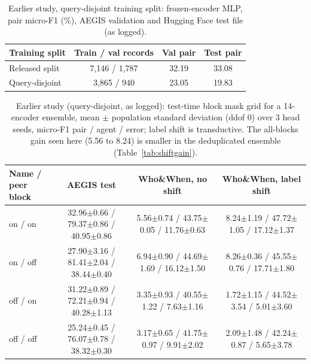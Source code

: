 
\begin{table}[t]
\caption{Earlier study, query-disjoint training split: frozen-encoder MLP, pair micro-F1 (\%), AEGIS validation and Hugging Face test file (as logged).}
\label{tab:qd}
\centering\footnotesize\setlength{\tabcolsep}{3pt}
\begin{tabular}{@{}lccc@{}}
\toprule
Training split & Train / val records & Val pair & Test pair \\
\midrule
Released split & 7,146 / 1,787 & 32.19 & 33.08 \\
Query-disjoint & 3,865 / 940 & 23.05 & 19.83 \\
\bottomrule
\end{tabular}
\end{table}

\begin{table}[t]
\caption{Earlier study (query-disjoint, as logged): test-time block mask grid for a 14-encoder ensemble, mean $\pm$ population standard deviation (ddof 0) over 3 head seeds, micro-F1 pair / agent / error; label shift is transductive. The all-blocks gain seen here (5.56 to 8.24) is smaller in the deduplicated ensemble (Table~\ref{tab:shiftgain}).}
\label{tab:legacygrid}
\centering\footnotesize\setlength{\tabcolsep}{3pt}
\begin{tabular}{@{}lccc@{}}
\toprule
Name / peer block & AEGIS test & Who\&When, no shift & Who\&When, label shift \\
\midrule
on / on & 32.96$\pm$0.66 / 79.37$\pm$0.86 / 40.95$\pm$0.86 & 5.56$\pm$0.74 / 43.75$\pm$0.05 / 11.76$\pm$0.63 & 8.24$\pm$1.19 / 47.72$\pm$1.05 / 17.12$\pm$1.37 \\
on / off & 27.90$\pm$3.16 / 81.41$\pm$2.04 / 38.44$\pm$0.40 & 6.94$\pm$0.90 / 44.69$\pm$1.69 / 16.12$\pm$1.50 & 8.26$\pm$0.36 / 45.55$\pm$0.76 / 17.71$\pm$1.80 \\
off / on & 31.22$\pm$0.89 / 72.21$\pm$0.94 / 40.28$\pm$1.13 & 3.35$\pm$0.93 / 40.55$\pm$1.22 / 7.63$\pm$1.16 & 1.72$\pm$1.15 / 44.52$\pm$3.54 / 5.01$\pm$3.60 \\
off / off & 25.24$\pm$0.45 / 76.07$\pm$0.78 / 38.32$\pm$0.30 & 3.17$\pm$0.65 / 41.75$\pm$0.97 / 9.91$\pm$2.02 & 2.09$\pm$1.48 / 42.24$\pm$0.87 / 5.65$\pm$3.78 \\
\bottomrule
\end{tabular}
\end{table}


